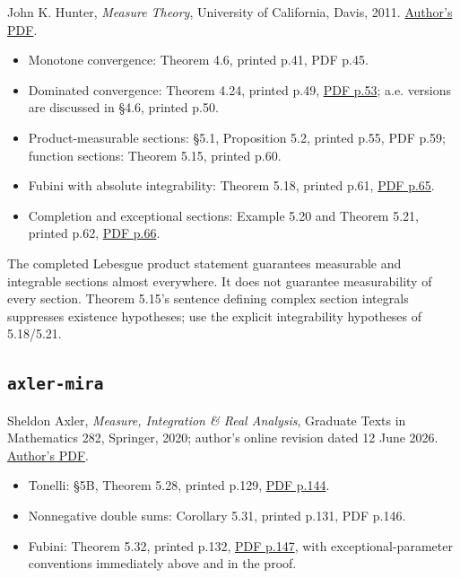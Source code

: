 \documentclass[
  11pt,
]{article}
\providecommand{\tightlist}{%
  \setlength{\itemsep}{0pt}\setlength{\parskip}{0pt}}
\begin{document}
John K. Hunter, \emph{Measure Theory}, University of California, Davis,
2011.
\href{https://www.math.ucdavis.edu/~hunter/measure_theory/measure_notes.pdf}{Author's
PDF}.

\begin{itemize}
\tightlist
\item
  Monotone convergence: Theorem 4.6, printed p.41, PDF p.45.
\item
  Dominated convergence: Theorem 4.24, printed p.49,
  \href{https://www.math.ucdavis.edu/~hunter/measure_theory/measure_notes.pdf\#page=53}{PDF
  p.53}; a.e. versions are discussed in §4.6, printed p.50.
\item
  Product-measurable sections: §5.1, Proposition 5.2, printed p.55, PDF
  p.59; function sections: Theorem 5.15, printed p.60.
\item
  Fubini with absolute integrability: Theorem 5.18, printed p.61,
  \href{https://www.math.ucdavis.edu/~hunter/measure_theory/measure_notes.pdf\#page=65}{PDF
  p.65}.
\item
  Completion and exceptional sections: Example 5.20 and Theorem 5.21,
  printed p.62,
  \href{https://www.math.ucdavis.edu/~hunter/measure_theory/measure_notes.pdf\#page=66}{PDF
  p.66}.
\end{itemize}

The completed Lebesgue product statement guarantees measurable and
integrable sections almost everywhere. It does not guarantee
measurability of every section. Theorem 5.15's sentence defining complex
section integrals suppresses existence hypotheses; use the explicit
integrability hypotheses of 5.18/5.21.

\subsection{\texorpdfstring{\texttt{axler-\allowbreak{}mira}}{axler-mira}}\label{axler-mira}

Sheldon Axler, \emph{Measure, Integration \& Real Analysis}, Graduate
Texts in Mathematics 282, Springer, 2020; author's online revision dated
12 June 2026. \href{https://measure.axler.net/MIRA.pdf}{Author's PDF}.

\begin{itemize}
\tightlist
\item
  Tonelli: §5B, Theorem 5.28, printed p.129,
  \href{https://measure.axler.net/MIRA.pdf\#page=144}{PDF p.144}.
\item
  Nonnegative double sums: Corollary 5.31, printed p.131, PDF p.146.
\item
  Fubini: Theorem 5.32, printed p.132,
  \href{https://measure.axler.net/MIRA.pdf\#page=147}{PDF p.147}, with
  exceptional-parameter conventions immediately above and in the proof.
\end{itemize}
\end{document}
